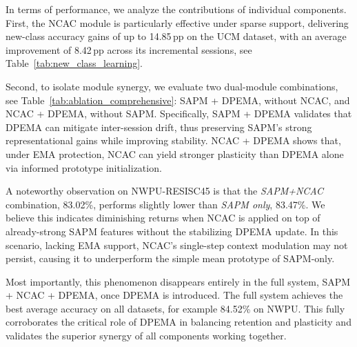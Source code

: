 ﻿\documentclass[letterpaper,journal]{IEEEtran}
\begin{document}
In terms of performance, we analyze the contributions of individual components. First, the NCAC module is particularly effective under sparse support, delivering new-class accuracy gains of up to 14.85\,pp on the UCM dataset, with an average improvement of 8.42\,pp across its incremental sessions, see Table~\ref{tab:new_class_learning}.

Second, to isolate module synergy, we evaluate two dual-module combinations, see Table~\ref{tab:ablation_comprehensive}: SAPM + DPEMA, without NCAC, and NCAC + DPEMA, without SAPM. Specifically, SAPM + DPEMA validates that DPEMA can mitigate inter-session drift, thus preserving SAPM's strong representational gains while improving stability. NCAC + DPEMA shows that, under EMA protection, NCAC can yield stronger plasticity than DPEMA alone via informed prototype initialization.

A noteworthy observation on NWPU-RESISC45 is that the \emph{SAPM+NCAC} combination, 83.02\%, performs slightly lower than \emph{SAPM only}, 83.47\%. We believe this indicates diminishing returns when NCAC is applied on top of already-strong SAPM features without the stabilizing DPEMA update. In this scenario, lacking EMA support, NCAC's single-step context modulation may not persist, causing it to underperform the simple mean prototype of SAPM-only.

Most importantly, this phenomenon disappears entirely in the full system, SAPM + NCAC + DPEMA, once DPEMA is introduced. The full system achieves the best average accuracy on all datasets, for example 84.52\% on NWPU. This fully corroborates the critical role of DPEMA in balancing retention and plasticity and validates the superior synergy of all components working together.
\end{document}
